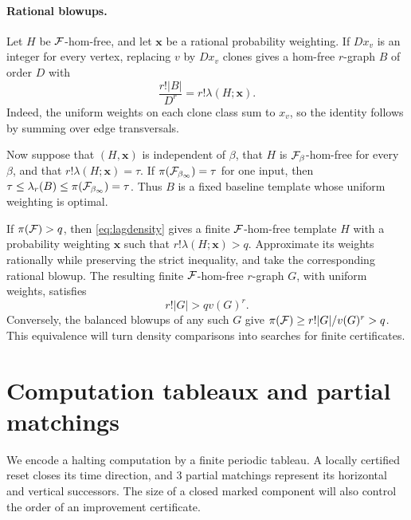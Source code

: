 \documentclass[10pt]{article}
\numberwithin{equation}{section}
\theoremstyle{definition}
\newcommand{\x}{\boldsymbol{x}}\newcommand{\y}{\boldsymbol{y}}
\begin{document}
\paragraph{Rational blowups.}
Let $H$ be $\mathcal F$-hom-free, and let $\x$ be a rational probability weighting. If $Dx_v$ is an integer for every vertex, replacing $v$ by $Dx_v$ clones gives a hom-free $r$-graph $B$ of order $D$ with
\begin{equation}\label{eq:rationalblowup}
 \frac{r!|B|}{D^r}=r!\lambda(H;\x).
\end{equation}
Indeed, the uniform weights on each clone class sum to $x_v$, so the identity follows by summing over edge transversals.

Now suppose that $(H,\x)$ is independent of $\beta$, that $H$ is $\mathcal F_\beta$-hom-free for every $\beta$, and that $r!\lambda(H;\x)=\tau$. If $\pi(\mathcal F_{\beta_\infty})=\tau$ for one input, then $\tau\le\lambda_r(B)\le\pi(\mathcal F_{\beta_\infty})=\tau$. Thus $B$ is a fixed baseline template whose uniform weighting is optimal.

If $\pi(\mathcal F)>q$, then \eqref{eq:lagdensity} gives a finite $\mathcal F$-hom-free template $H$ with a probability weighting $\x$ such that $r!\lambda(H;\x)>q$. Approximate its weights rationally while preserving the strict inequality, and take the corresponding rational blowup. The resulting finite $\mathcal F$-hom-free $r$-graph $G$, with uniform weights, satisfies
\begin{equation}\label{eq:finitecertificate}
 r!|G|>qv(G)^r.
\end{equation}
Conversely, the balanced blowups of any such $G$ give $\pi(\mathcal F)\ge r!|G|/v(G)^r>q$. This equivalence will turn density comparisons into searches for finite certificates.

\section{Computation tableaux and partial matchings}\label{ttm:sec:direct-tableau}
We encode a halting computation by a finite periodic tableau. A locally certified reset closes its time direction, and 3 partial matchings represent its horizontal and vertical successors. The size of a closed marked component will also control the order of an improvement certificate.
\end{document}
